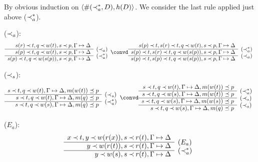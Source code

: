 \begin{PROOF}
By obvious induction on $\langle \#(\mathbin{\prec}_a^*,D),h(D)\rangle$. We consider the last rule
applied just above ($\mathbin{\prec}_a^*$).
\begin{LS}
\item ($\mathbin{\prec}_a$):
\[ \begin{array}{rl}
 s(r) \Incl t, q\Incl w(t), s\Incl p, \GSD \\ \cline{1-1}
 s(p) \Incl t, q\Incl w(t), s\Incl p, \GSD & \rabove{(\Incl_a)} \\
 \cline{1-1}
 s(p) \Incl t, q\Incl w(s(p)), s\Incl p, \GSD & \rabove{(\Incl_a^*)}
 \end{array} \convd
 \begin{array}{rl}
s(p)\Incl t, s(r)\Incl t, q\Incl w(t), s\Incl p, \GSD \\ \cline{1-1}
s(p)\Incl t, s(r)\Incl t, q\Incl w(s(p)), s\Incl p, \GSD &
\rabove{(\Incl_a^*)} \\ \cline{1-1}
s(p)\Incl t, s(p)\Incl t, q\Incl w(s(p)), s\Incl p, \GSD &
\rabove{(\Incl_a)} \end{array} \]
%
\item ($\mathbin{\prec}_s$):
\[ \begin{array}{rl}
s\Incl t, q\Incl w(t), \GSD, m(w(t))\preceq p \\ \cline{1-1}
s\Incl t, q\Incl w(t), \GSD, m(q)\preceq p & \rabove{(\Incl_s)} \\
\cline{1-1}
s\Incl t, q\Incl w(s), \GSD, m(q)\preceq p & \rabove{(\Incl_a^*)} \end{array} \convd
 \begin{array}{rl}
s\Incl t, q\Incl w(t), \GSD, m(w(t))\preceq p \\ \cline{1-1}
s\Incl t, q\Incl w(s), \GSD, m(w(t))\preceq p & \rabove{(\Incl_a^*)} \\
\cline{1-1}
s\Incl t, q\Incl w(s), \GSD, m(w(s))\preceq p & \rabove{(\Incl_s)} \\
\cline{1-1} 
s\Incl t, q\Incl w(s), \GSD, m(q)\preceq p & \rabove{(\Incl_s)} 
\end{array} \]
\item ($E_a$):
\[ \begin{array}{rl}
x\Incl t, y\Incl w(r(x)), s\Incl r(t), \GSD \\ \cline{1-1}
          y\Incl w(r(t)), s\Incl r(t), \GSD  & \rabove{(E_a)} \\ \cline{1-1}
          y\Incl w(s), s\Incl r(t), \GSD  & \rabove{(\Incl_a^*)} \end{array}
\]
\end{LS}
\end{PROOF}

